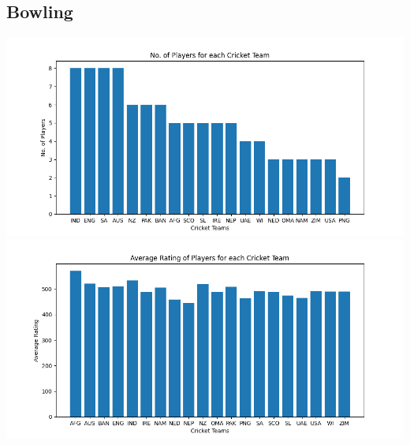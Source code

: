 \documentclass{article}
\begin{document}
\begin{normalsize}
            \subsection{Bowling}\label{subsec:bowling2}
                \includegraphics[scale=0.7]{odi_bowling-1}
                \vspace{1em}\\
                \includegraphics[scale=0.7]{odi_bowling-2}

\end{normalsize}
\end{document}

